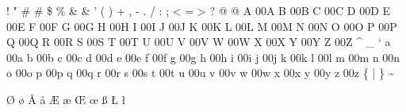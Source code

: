 \declchar  { }  
\declchar  !    
\declchar  "    
\declchar  #    
\declchar  \#   
\declchar  \$   
\declchar  \%   
\declchar  &    
\declchar  \&   
\declchar  '    
\declchar  (    
\declchar  )    
\declchar  *    
\declchar  +    
\declchar  ,    
\declchar  -    
\declchar  .    
\declchar  /    
    
    
    
    
    
    
    
    
    
    
\declchar  :    
\declchar  ;    
\declchar  <    
\declchar  =    
\declchar  >    
\declchar  ?    
\declchar  @    @
\declchar  A    \000A
\declchar  B    \000B
\declchar  C    \000C
\declchar  D    \000D
\declchar  E    \000E
\declchar  F    \000F
\declchar  G    \000G
\declchar  H    \000H
\declchar  I    \000I
\declchar  J    \000J
\declchar  K    \000K
\declchar  L    \000L
\declchar  M    \000M
\declchar  N    \000N
\declchar  O    \000O
\declchar  P    \000P
\declchar  Q    \000Q
\declchar  R    \000R
\declchar  S    \000S
\declchar  T    \000T
\declchar  U    \000U
\declchar  V    \000V
\declchar  W    \000W
\declchar  X    \000X
\declchar  Y    \000Y
\declchar  Z    \000Z
    
\declchar  ^    
\declchar  _    
\declchar  `    
\declchar  a    \000a
\declchar  b    \000b
\declchar  c    \000c
\declchar  d    \000d
\declchar  e    \000e
\declchar  f    \000f
\declchar  g    \000g
\declchar  h    \000h
\declchar  i    \000i
\declchar  j    \000j
\declchar  k    \000k
\declchar  l    \000l
\declchar  m    \000m
\declchar  n    \000n
\declchar  o    \000o
\declchar  p    \000p
\declchar  q    \000q
\declchar  r    \000r
\declchar  s    \000s
\declchar  t    \000t
\declchar  u    \000u
\declchar  v    \000v
\declchar  w    \000w
\declchar  x    \000x
\declchar  y    \000y
\declchar  z    \000z
\declchar  \{   
\declchar  |    
\declchar  \}   
\declchar  \~   
\declchar  ~    

\declchar  \O   {}
\declchar  \o   {}
\declchar  \AA  {}
\declchar  \aa  {}
\declchar  \AE  {}
\declchar  \ae  {}
\declchar  \OE  {}
\declchar  \oe  {}
\declchar  \ss  {}
\declchar  \L   {}
\declchar  \l   {}

